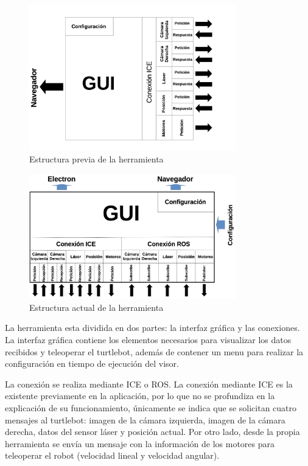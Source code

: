 \begin{figure}[H]
  \begin{center}
    \includegraphics[width=0.8\textwidth]{figures/estrucuturaturtlebotviz1.png}
		\caption{Estructura previa de la herramienta}
		\label{fig.estructuracamviz2}
		\end{center}
\end{figure}

\begin{figure}[H]
  \begin{center}
    \includegraphics[width=0.8\textwidth]{figures/estrucuturaturtlebotviz2.png}
		\caption{Estructura actual de la herramienta}
		\label{fig.estructuracamviz2}
		\end{center}
\end{figure}

La herramienta esta dividida en dos partes: la interfaz gráfica y las conexiones. La interfaz gráfica contiene los elementos necesarios para visualizar los datos recibidos y teleoperar el turtlebot, además de contener un menu para realizar la configuración en tiempo de ejecución del visor.

La conexión se realiza mediante ICE o ROS. La conexión mediante ICE es la existente previamente en la aplicación, por lo que no se profundiza en la explicación de su funcionamiento, únicamente se indica que se solicitan cuatro mensajes al turtlebot: imagen de la cámara izquierda, imagen de la cámara derecha, datos del sensor láser y posición actual. Por otro lado, desde la propia herramienta se envía un mensaje con la información de los motores para teleoperar el robot (velocidad lineal y velocidad angular).

